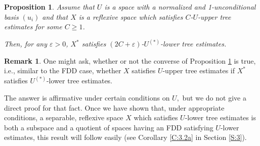 \documentclass[11pt,leqno]{amsart}
\newtheorem{prop}[thm]{Proposition}
\theoremstyle{definition}
\newtheorem*{remark}{Remark}
\newcommand{\vp}{\varepsilon}
\newcommand{\Us}{U^{(*)}}
\begin{document}
\begin{prop}\label{P:1.4} Assume that $U$ is a space
  with a normalized and 1-unconditional basis $(u_i)$ and that $X$ is a reflexive space which
  satisfies  $C$-$U$-upper tree estimates for some $C\ge 1$.

Then, for any $\vp>0$, $X^*$ satisfies $(2C+\vp)$-$\Us$-lower tree estimates.
\end{prop}
\begin{remark} One might ask, whether or not
the converse of Proposition \ref{P:1.4} is true, i.e., similar to the
FDD case, whether
 $X$ satisfies $U$-upper tree estimates if
 $X^*$ satisfies $\Us$-lower tree estimates.

The answer is affirmative under certain conditions on $U,$ but we do
not give a direct proof for that fact. Once we  have shown
that, under appropriate conditions, a separable, reflexive space
 $X$ which satisfies $U$-lower tree estimates is both a subspace and a
quotient of spaces
 having an
 FDD   satisfying $U$-lower estimates,  this result  will
 follow easily
 (see Corollary \ref{C:3.2a} in Section \ref{S:3}).
\end{remark}
\end{document}
